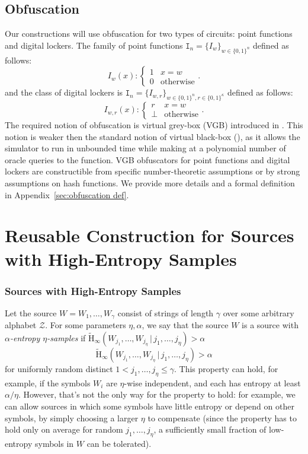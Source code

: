 \documentclass[11pt]{article}
\renewcommand{\paragraph}[1]{\subsubsection{#1}}
\newcommand{\apref}[1]{\mbox{Appendix~\ref{#1}}}
\newcommand{\zo}{\ensuremath{\{0, 1\}}}
\newcommand{\Hav}{\tilde{\mathrm{H}}_\infty}
\newcommand{\subsetEntropy}{\alpha}
\begin{document}
\subsection{Obfuscation}
Our constructions will use obfuscation for two types of circuits: point functions and digital lockers. The family of point functions $\mathtt{I}_n = \{I_w\}_{w \in \zo^n}$ defined as follows:
\[
I_w(x):\begin{cases} 1 & x=w\\0 & \text{otherwise}\end{cases}.
\]
and the class of digital lockers is $\mathtt{I}_n = \{I_{w, r}\}_{w \in \zo^n, r\in\zo^\kappa}$ defined as follows:
\[
I_{w, r}(x):\begin{cases} r & x=w\\\perp & \text{otherwise}\end{cases}.
\]
The required notion of obfuscation is virtual grey-box (VGB) introduced in \cite{bitansky2010strong}. This notion is weaker then the standard notion of virtual black-box (\cite{barak2001possibility}), as it allows the simulator to run in unbounded time while making at a polynomial number of oracle queries to the function. VGB obfuscators for point functions and digital lockers are constructible from specific number-theoretic assumptions or by strong assumptions on hash functions.  We provide more details and a formal definition in \apref{sec:obfuscation def}.

\section{Reusable Construction for Sources with High-Entropy Samples}
\label{sec:sampling}

\paragraph{Sources with High-Entropy Samples}
Let the source $W=W_1, \dots, W_\gamma$ consist of strings of length $\gamma$ over some arbitrary alphabet $\mathcal{Z}$. For some parameters $\eta, \subsetEntropy$, we say that the source $W$ is a source with  \emph{$\subsetEntropy$-entropy $\eta$-samples} if 
\ifnum{}
$\Hav(W_{j_1}, \dots, W_{j_\eta}\, |\, j_1, \dots, j_\eta)>\subsetEntropy$ 
\else
\[
\Hav(W_{j_1}, \dots, W_{j_\eta}\, |\, j_1, \dots, j_\eta)>\subsetEntropy
\]
\fi
for uniformly random distinct $1< j_1, \dots, j_\eta \le \gamma$. This property can hold, for example, if the symbols $W_i$ are $\eta$-wise independent, and each has entropy at least $\subsetEntropy/\eta$. However, that's not the only way for the property to hold: for example, we can allow sources in which some symbols have little entropy or depend on other symbols, by simply choosing a larger $\eta$ to compensate (since the property has to hold only on  average for random $j_1, \dots, j_\eta$, a sufficiently small fraction of low-entropy symbols in $W$ can be tolerated).
\end{document}
